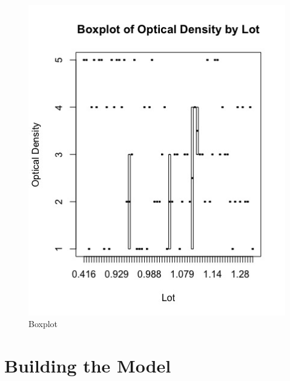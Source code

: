 \begin{figure}%
        \centering
                \includegraphics[width = .5\textwidth]{pictures/ANOVA/BoxPlotOpticalDensity.jpg} 
        \caption{Boxplot}
        \label{fig:BoxPlotOpticalDensity}
\end{figure}

 

\section{Building the Model}

